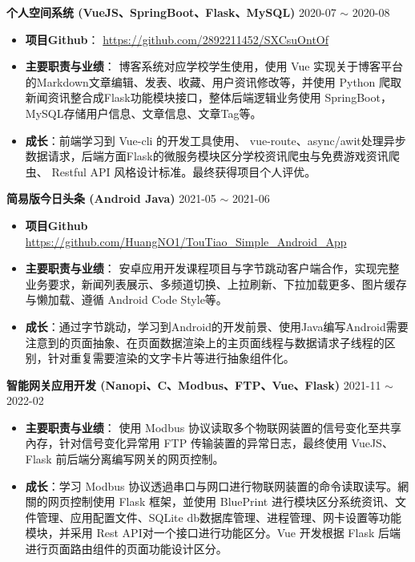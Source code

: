 \documentclass[10pt, a4paper]{article}
\begin{document}
\textbf{个人空间系统 (VueJS、SpringBoot、Flask、MySQL)} \hfill 2020-07 $\sim$ 2020-08

\begin{itemize}[parsep=0.5ex]
\item \textbf{项目Github}： \href{https://github.com/2892211452/SXCsuOntOf}{https://github.com/2892211452/SXCsuOntOf}

\item \textbf{主要职责与业绩}： \quad 博客系统对应学校学生使用，使用 Vue 实现关于博客平台的Markdown文章编辑、发表、收藏、用户资讯修改等，并使用 Python 爬取新闻资讯整合成Flask功能模块接口，整体后端逻辑业务使用 SpringBoot，MySQL存储用户信息、文章信息、文章Tag等。

\item \textbf{成长}：前端学习到 Vue-cli 的开发工具使用、 vue-route、async/awit处理异步数据请求，后端方面Flask的微服务模块区分学校资讯爬虫与免费游戏资讯爬虫、 Restful API 风格设计标准。最终获得项目个人评优。
\end{itemize}

\textbf{简易版今日头条 (Android Java)} \hfill 2021-05 $\sim$ 2021-06


\begin{itemize}[parsep=0.5ex]
\item \textbf{项目Github} \href{https://github.com/HuangNO1/TouTiao_Simple_Android_App}{https://github.com/HuangNO1/TouTiao\_Simple\_Android\_App}

\item \textbf{主要职责与业绩}： \quad 安卓应用开发课程项目与字节跳动客户端合作，实现完整业务要求，新闻列表展示、多频道切换、上拉刷新、下拉加载更多、图片缓存与懒加载、遵循 Android Code Style等。

\item \textbf{成长}：通过字节跳动，学习到Android的开发前景、使用Java编写Android需要注意到的页面抽象、在页面数据渲染上的主页面线程与数据请求子线程的区别，针对重复需要渲染的文字卡片等进行抽象组件化。
\end{itemize}

\textbf{智能网关应用开发 (Nanopi、C、Modbus、FTP、Vue、Flask)} \hfill 2021-11 $\sim$ 2022-02

\begin{itemize}[parsep=0.5ex]
\item \textbf{主要职责与业绩}： \quad 使用 Modbus 协议读取多个物联网装置的信号变化至共享內存，针对信号变化异常用 FTP 传输装置的异常日志，最终使用 VueJS、Flask 前后端分离编写网关的网页控制。

\item \textbf{成长}：学习 Modbus 协议透過串口与网口进行物联网装置的命令读取读写。網關的网页控制使用 Flask 框架，並使用 BluePrint 进行模块区分系统资讯、文件管理、应用配置文件、SQLite db数据库管理、进程管理、网卡设置等功能模块，并采用 Rest API对一个接口进行功能区分。Vue 开发根据 Flask 后端进行页面路由组件的页面功能设计区分。
\end{itemize}
\end{document}
